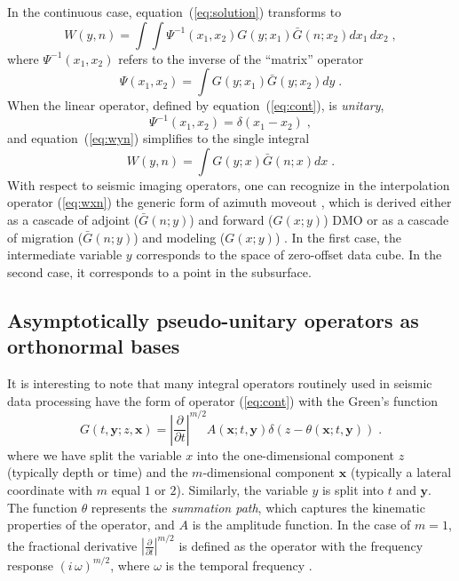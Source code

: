 In the continuous case, equation~(\ref{eq:solution}) transforms to
\begin{equation}\label{eq:wyn}
  W (y, n) = \int\!\!\int \Psi^{-1} (x_1, x_2) G (y;x_1) \bar{G} (n;x_2)
  dx_1\,dx_2\;,
\end{equation}
where $\Psi^{-1} (x_1, x_2)$ refers to the inverse of the ``matrix''
operator
\begin{equation}\label{eq:psi}
  \Psi (x_1, x_2) = \int G (y;x_1) \bar{G} (y;x_2) dy\;.
\end{equation}
When the linear operator, defined by equation~(\ref{eq:cont}), is
\emph{unitary},
\begin{equation}\label{eq:delta}
\Psi^{-1} (x_1, x_2) = \delta (x_1 - x_2)\;,
\end{equation}
and equation~(\ref{eq:wyn}) simplifies to the single integral
\begin{equation}\label{eq:wxn}
  W (y, n) = \int G (y;x) \bar{G} (n;x) dx \;.
\end{equation}
With respect to seismic imaging operators, one can recognize in the
interpolation operator (\ref{eq:wxn}) the generic form of azimuth moveout
\cite[]{Biondi.sep.93.15}, which is derived either as a cascade of adjoint
($\bar{G}(n;y)$) and forward ($G (x;y)$) DMO or as a cascade of migration
($\bar{G} (n;y)$) and modeling ($G (x;y)$)
\cite[]{Fomel.sep.84.25,GEO63-02-05740588}. In the first case, the
intermediate variable $y$ corresponds to the space of zero-offset data cube.
In the second case, it corresponds to a point in the subsurface.

\subsection{Asymptotically pseudo-unitary operators as orthonormal bases}

It is interesting to note that many integral operators routinely used
in seismic data processing have the form of operator (\ref{eq:cont})
with the Green's function
\begin{equation}
  \label{eq:green}
  G (t,\mathbf{y};z,\mathbf{x}) = \left|\frac{\partial}{\partial t}\right|^{m/2}
  A (\mathbf{x};t,\mathbf{y})
  \delta \left(z - \theta(\mathbf{x};t,\mathbf{y}) \right)\;.
\end{equation}
where we have split the variable $x$ into the one-dimensional
component $z$ (typically depth or time) and the $m$-dimensional
component $\mathbf{x}$ (typically a lateral coordinate with $m$ equal
$1$ or $2$). Similarly, the variable $y$ is split into $t$ and
$\mathbf{y}$.  The function $\theta$ represents the \emph{summation
  path}, which captures the kinematic properties of the operator, and
$A$ is the amplitude function. In the case of $m=1$, the fractional
derivative $\left|\frac{\partial}{\partial t}\right|^{m/2}$ is defined
as the operator with the frequency response $(i\,\omega)^{m/2}$, where
$\omega$ is the temporal frequency \cite[]{samko}.

